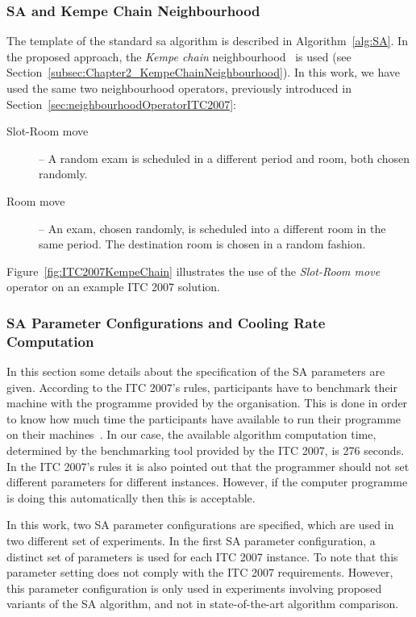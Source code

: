 \subsubsection{SA and Kempe Chain Neighbourhood}
\label{sec:KempeChainNeighbourhood}

The template of the standard \gls{sa} algorithm is described in Algorithm~\ref{alg:SA}. In the proposed approach, the \textit{Kempe chain} neighbourhood~\citep{Thompson1998} is used (see Section~\ref{subsec:Chapter2_KempeChainNeighbourhood}). In this work, we have used the same two neighbourhood operators, previously introduced in Section~\ref{sec:neighbourhoodOperatorITC2007}:
\begin{description}
	\item[Slot-Room move] -- A random exam is scheduled in a different period and room, both chosen randomly.
	
	\item[Room move] -- An exam, chosen randomly, is scheduled into a different room in the same period. The destination room is chosen in a random fashion.
\end{description}

Figure~\ref{fig:ITC2007KempeChain} illustrates the use of the \textit{Slot-Room move} operator on an example ITC 2007 solution. 



\subsubsection{SA Parameter Configurations and Cooling Rate Computation}
\label{subsubsec:CoolingRateComputation}

In this section some details about the specification of the SA parameters are given. According to the ITC 2007's rules, participants have to benchmark their machine with the programme provided by the organisation. This is done in order to know how much time the participants have available to run their programme on their machines~\citep{ITC2007}. In our case, the available algorithm computation time, determined by the  benchmarking tool provided by the ITC 2007, is 276 seconds. In the ITC 2007's rules it is also pointed out that the programmer should not set different parameters for different instances. However, if the computer programme is doing this automatically then this is acceptable.

In this work, two SA parameter configurations are specified, which are used in two different set of experiments. In the first SA parameter configuration, a distinct set of parameters is used for each ITC 2007 instance. To note that this parameter setting does not comply with the ITC 2007 requirements. However, this parameter configuration is only used in experiments involving proposed variants of the SA algorithm, and not in state-of-the-art algorithm comparison.

